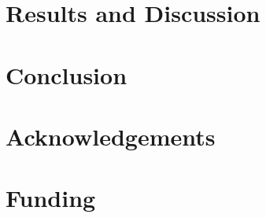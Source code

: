\documentclass{bioinfo}
\begin{document}
\section{Results and Discussion}



\section{Conclusion}

\section*{Acknowledgements}

\section*{Funding}



\end{document}
